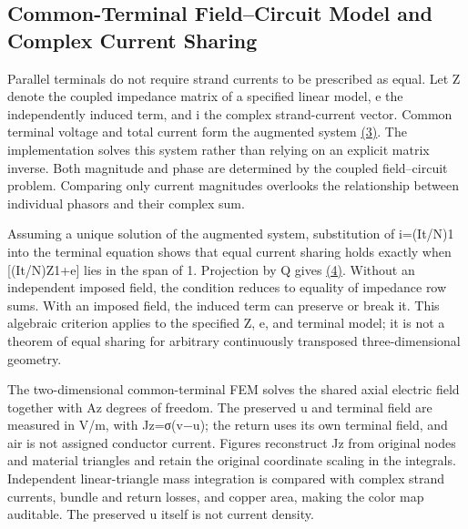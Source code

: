 \documentclass[11pt]{article}
\begin{document}
\subsection*{Common-Terminal Field–Circuit Model and Complex Current Sharing}
\hypertarget{02.common.heading}{}
Parallel terminals do not require strand currents to be prescribed as equal. Let Z denote the coupled impedance matrix of a specified linear model, e the independently induced term, and i the complex strand-current vector. Common terminal voltage and total current form the augmented system \href{paper_en_single.pdf#E04}{(3)}. The implementation solves this system rather than relying on an explicit matrix inverse. Both magnitude and phase are determined by the coupled field–circuit problem. Comparing only current magnitudes overlooks the relationship between individual phasors and their complex sum.


Assuming a unique solution of the augmented system, substitution of i=(It/N)1 into the terminal equation shows that equal current sharing holds exactly when [(It/N)Z1+e] lies in the span of 1. Projection by Q gives \href{paper_en_single.pdf#E05}{(4)}. Without an independent imposed field, the condition reduces to equality of impedance row sums. With an imposed field, the induced term can preserve or break it. This algebraic criterion applies to the specified Z, e, and terminal model; it is not a theorem of equal sharing for arbitrary continuously transposed three-dimensional geometry.


The two-dimensional common-terminal FEM solves the shared axial electric field together with Az degrees of freedom. The preserved u and terminal field are measured in V/m, with Jz=σ(v−u); the return uses its own terminal field, and air is not assigned conductor current. Figures reconstruct Jz from original nodes and material triangles and retain the original coordinate scaling in the integrals. Independent linear-triangle mass integration is compared with complex strand currents, bundle and return losses, and copper area, making the color map auditable. The preserved u itself is not current density.
\end{document}
